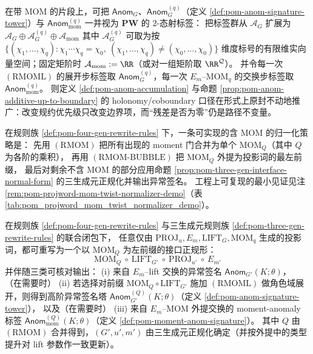 \begin{remark}\label{rem:pom-anom-cohomology-mom}
在带 \(\mathrm{MOM}\) 的片段上，可把 \(\mathsf{Anom}_G\)、\(\mathsf{Anom}^{(q)}_{G}\)（定义 \ref{def:pom-anom-signature-tower}）与 \(\mathsf{Anom}^{(q)}_{\mathrm{mom}}\) 一并视为 \(\mathbf{PW}\) 的 \(2\)-态射标签：
把标签群从 \(\mathcal{A}_G\) 扩展为
\(
\mathcal{A}_G\oplus\mathcal{A}^{(q)}_{G}\oplus\mathcal{A}_{\mathrm{mom}}
\)
其中 \(\mathcal{A}^{(q)}_{G}\) 可取为按 \(\{(\chi_1,\dots,\chi_q):\chi_1\cdots\chi_q=\chi_0,\ (\chi_1,\dots,\chi_q)\neq(\chi_0,\dots,\chi_0)\}\) 维度标号的有限维实向量空间；固定矩阶时 \(\mathcal{A}_{\mathrm{mom}}:=\RR\)（或对一组矩阶取 \(\RR^{\mathcal{Q}}\)）。
并令每一次 \((\mathrm{RMOML})\) 的展开步标签取 \(\mathsf{Anom}^{(q)}_{G}\)，每一次 \(E_m\)--\(\mathrm{MOM}_q\) 的交换步标签取 \(\mathsf{Anom}^{(q)}_{\mathrm{mom}}\)。
则定义 \ref{def:pom-anom-accumulation} 与命题 \ref{prop:pom-anom-additive-up-to-boundary} 的 holonomy/coboundary 口径在形式上原封不动地推广：改变规约优先级只改变边界项，而“残差是否为零”仍是路径不变量。
\end{remark}

\begin{remark}\label{rem:pom-mom-normalize-strategy}
在规则族 \ref{def:pom-four-gen-rewrite-rules} 下，一条可实现的含 \(\mathrm{MOM}\) 的归一化策略是：
先用 \((\mathrm{RMOM})\) 把所有出现的 moment 门合并为单个 \(\mathrm{MOM}_Q\)（其中 \(Q\) 为各阶的乘积），
再用 \((\mathrm{RMOM\text{-}BUBBLE})\) 把 \(\mathrm{MOM}_Q\) 外提为投影词的最左前缀，
最后对剩余不含 \(\mathrm{MOM}\) 的部分应用命题 \ref{prop:pom-three-gen-interface-normal-form} 的三生成元正规化并输出异常签名。
工程上可复现的最小见证见注 \ref{rem:pom-projword-mom-twist-normalizer-demo}（表 \ref{tab:pom_projword_mom_twist_normalizer_demo}）。
\end{remark}

\begin{proposition}\label{prop:pom-mom-interface-normal-form}
在规则族 \ref{def:pom-four-gen-rewrite-rules} 与三生成元规则族 \ref{def:pom-three-gen-rewrite-rules} 的联合闭包下，
任意仅由 \(\mathrm{PROJ}_u,E_m,\mathrm{LIFT}_G,\mathrm{MOM}_q\) 生成的投影词，都可重写为一个以 \(\mathrm{MOM}_Q\) 为左前缀的接口正规形：
$$
\boxed{\;
\mathrm{MOM}_Q\ \circ\ \mathrm{LIFT}_{G'}\ \circ\ \mathrm{PROJ}_{u'}\ \circ\ E_{m'}
\;}
$$
并伴随三类可核对输出：
(i) 来自 \(E_m\)--lift 交换的异常签名 \(\mathsf{Anom}_{G'}(K;\theta)\)，
（在需要时）
(ii) 若选择对前缀 \(\mathrm{MOM}_Q\circ \mathrm{LIFT}_{G'}\) 施加 \((\mathrm{RMOML})\) 做角色域展开，则得到高阶异常签名塔 \(\mathsf{Anom}^{(Q)}_{G'}(K;\theta)\)（定义 \ref{def:pom-anom-signature-tower}），
以及（在需要时）
(iii) 来自 \(E_m\)--\(\mathrm{MOM}\) 外提交换的 moment-anomaly 标签 \(\mathsf{Anom}^{(Q)}_{\mathrm{mom}}(K;\theta)\)（定义 \ref{def:pom-moment-anom-signature}）。
其中 \(Q\) 由 \((\mathrm{RMOM})\) 合并得到，\((G',u',m')\) 由三生成元正规化确定（并按外提中的类型提升对 lift 参数作一致更新）。
\end{proposition}

